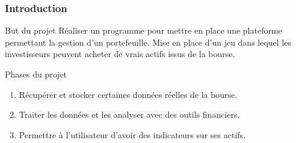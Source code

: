 
\begin{frame}
    \frametitle{Introduction}    		
    \begin{block}{But du projet}
	Réaliser un programme pour mettre en place une plateforme permettant la gestion d'un portefeuille. Mise en place d'un jeu dans lequel les investisseurs peuvent acheter de vrais actifs issus de la bourse.
    \end{block}

    \begin{block}{Phases du projet}
	\begin{enumerate}
	 \item Récupérer et stocker certaines données réelles de la bourse.
	 \item Traiter les données et les analyser avec des outils financiers.
	 \item Permettre à l'utilisateur d'avoir des indicateurs sur ses actifs.
	\end{enumerate}

    \end{block}

\end{frame}